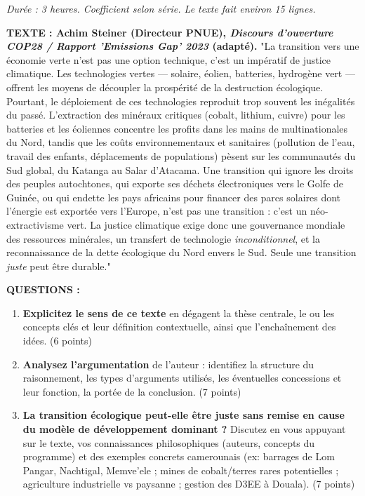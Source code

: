 \documentclass[11pt]{article}
\newcommand{\cle}[1]{{\popxbold\color{popdark}#1}}
\begin{document}
\begin{exercice}
\emph{Durée : 3 heures. Coefficient selon série. Le texte fait environ 15 lignes.}

\textbf{TEXTE : Achim Steiner (Directeur PNUE), \emph{Discours d'ouverture COP28 / Rapport 'Emissions Gap' 2023} (adapté).}
"La transition vers une économie verte n'est pas une option technique, c'est un impératif de \cle{justice climatique}. Les technologies vertes — solaire, éolien, batteries, hydrogène vert — offrent les moyens de découpler la prospérité de la destruction écologique. Pourtant, le déploiement de ces technologies reproduit trop souvent les inégalités du passé. L'extraction des minéraux critiques (cobalt, lithium, cuivre) pour les batteries et les éoliennes concentre les profits dans les mains de multinationales du Nord, tandis que les coûts environnementaux et sanitaires (pollution de l'eau, travail des enfants, déplacements de populations) pèsent sur les communautés du Sud global, du Katanga au Salar d'Atacama. Une transition qui ignore les droits des peuples autochtones, qui exporte ses déchets électroniques vers le Golfe de Guinée, ou qui endette les pays africains pour financer des parcs solaires dont l'énergie est exportée vers l'Europe, n'est pas une transition : c'est un \cle{néo-extractivisme} vert. La \cle{justice climatique} exige donc une \cle{gouvernance mondiale} des ressources minérales, un transfert de technologie \emph{inconditionnel}, et la reconnaissance de la \cle{dette écologique} du Nord envers le Sud. Seule une transition \emph{juste} peut être durable."

\textbf{QUESTIONS :}
\begin{enumerate}
    \item \textbf{Explicitez le sens de ce texte} en dégagent la thèse centrale, le ou les concepts clés et leur définition contextuelle, ainsi que l'enchaînement des idées. (6 points)
    \item \textbf{Analysez l'argumentation} de l'auteur : identifiez la structure du raisonnement, les types d'arguments utilisés, les éventuelles concessions et leur fonction, la portée de la conclusion. (7 points)
    \item \textbf{La transition écologique peut-elle être juste sans remise en cause du modèle de développement dominant ?} Discutez en vous appuyant sur le texte, vos connaissances philosophiques (auteurs, concepts du programme) et des exemples concrets camerounais (ex: barrages de Lom Pangar, Nachtigal, Memve'ele ; mines de cobalt/terres rares potentielles ; agriculture industrielle vs paysanne ; gestion des D3EE à Douala). (7 points)
\end{enumerate}
\end{exercice}
\end{document}
